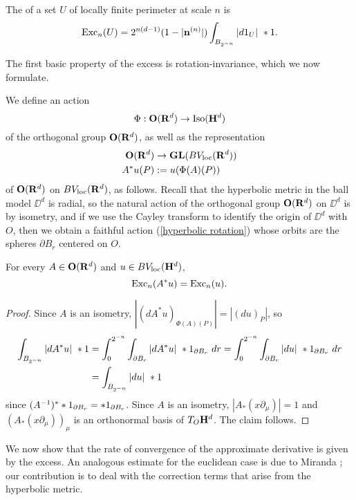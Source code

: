 \begin{definition}
The  of a set $U$ of locally finite perimeter at scale $n$ is
$$\operatorname{Exc}_n(U) = 2^{n(d - 1)} (1 - |\mathbf n^{(n)}|) \int_{B_{2^{-n}}} |d1_U| ~*1.$$
\end{definition}

The first basic property of the excess is rotation-invariance, which we now formulate.

\begin{notation}
We define an action
\begin{equation}\label{hyperbolic rotation}
    \Phi: \mathbf{O}(\mathbf{R}^d) \to \operatorname{Iso}(\mathbf H^d)
\end{equation}
of the orthogonal group $\mathbf{O}(\mathbf{R}^d)$, as well as the representation
\begin{align*}
\mathbf{O}(\mathbf{R}^d) &\to \mathbf{GL}(BV_{\mathrm{loc}}(\mathbf{R}^d))\\
A^* u(P) &:= u(\Phi(A)(P))
\end{align*}
of $\mathbf{O}(\mathbf{R}^d)$ on $BV_{\mathrm{loc}}(\mathbf{R}^d)$, as follows.
Recall that the hyperbolic metric in the ball model $\DD^d$ is radial, so the natural action of the orthogonal group $\mathbf{O}(\mathbf{R}^d)$ on $\DD^d$ is by isometry, and if we use the Cayley transform to identify the origin of $\DD^d$ with $O$, then we obtain a faithful action (\ref{hyperbolic rotation}) whose orbits are the spheres $\partial B_r$ centered on $O$.
\end{notation}

\begin{lemma}\label{excess rotation invariant}
For every $A \in \mathbf{O}(\mathbf{R}^d)$ and $u \in BV_{\mathrm{loc}}(\mathbf H^d)$,
$$\operatorname{Exc}_n(A^* u) = \operatorname{Exc}_n(u).$$
\end{lemma}
\begin{proof}
Since $A$ is an isometry, $|(d A^* u)_{\Phi(A)(P)}| = |(du)_P|$, so
\begin{align*}
\int_{B_{2^{-n}}} |dA^*u| ~*1 &= \int_0^{2^{-n}} \int_{\partial B_r} |dA^* u| ~*1_{\partial B_r} ~dr = \int_0^{2^{-n}} \int_{\partial B_r} |du| ~*1_{\partial B_r} ~dr\\
&= \int_{B_{2^{-n}}} |du| ~*1
\end{align*}
since $(A^{-1})^* *1_{\partial B_r} = *1_{\partial B_r}$.
Since $A$ is an isometry, $|A_* (x \partial_\mu)| = 1$ and $(A_*(x \partial_\mu))_\mu$ is an orthonormal basis of $T_O \mathbf H^d$.
The claim follows.
\end{proof}

We now show that the rate of convergence of the approximate derivative is given by the excess.
An analogous estimate for the euclidean case is due to Miranda \cite[pg661]{Miranda66}; our contribution is to deal with the correction terms that arise from the hyperbolic metric.

